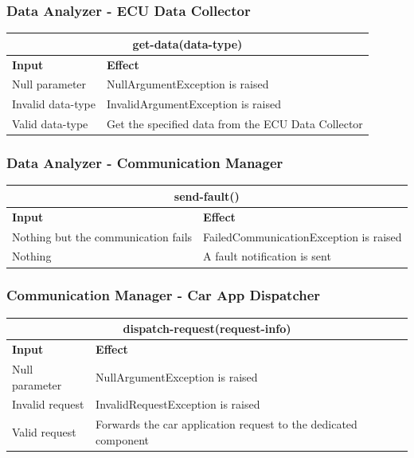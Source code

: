 \documentclass{article}
\begin{document}
\subsubsection{Data Analyzer - ECU Data Collector}
\begin{tabular}{ |p{5cm}|p{7cm}| }
  \hline
  \multicolumn{2}{|c|}{get-data(data-type)} \\
  \hline
  \textbf{Input} & \textbf{Effect} \\
  \hline
  Null parameter & NullArgumentException is raised\\
  \hline
  Invalid data-type & InvalidArgumentException is raised\\
  \hline
   Valid data-type & Get the specified data from the ECU Data Collector\\
  \hline
\end{tabular}
\subsubsection{Data Analyzer - Communication Manager}
\begin{tabular}{ |p{5cm}|p{7cm}| }
  \hline
  \multicolumn{2}{|c|}{send-fault()} \\
  \hline
  \textbf{Input} & \textbf{Effect} \\
  \hline
  Nothing but the communication fails & FailedCommunicationException is raised\\
  \hline
  Nothing & A fault notification is sent\\
  \hline
\end{tabular}
\subsubsection{Communication Manager - Car App Dispatcher}
\begin{tabular}{ |p{5cm}|p{7cm}| }
  \hline
  \multicolumn{2}{|c|}{dispatch-request(request-info)} \\
  \hline
  \textbf{Input} & \textbf{Effect} \\
  \hline
  Null parameter & NullArgumentException is raised\\
  \hline
  Invalid request & InvalidRequestException is raised \\
  \hline
  Valid request & Forwards the car application request to the dedicated component\\
  \hline
\end{tabular}
\end{document}
